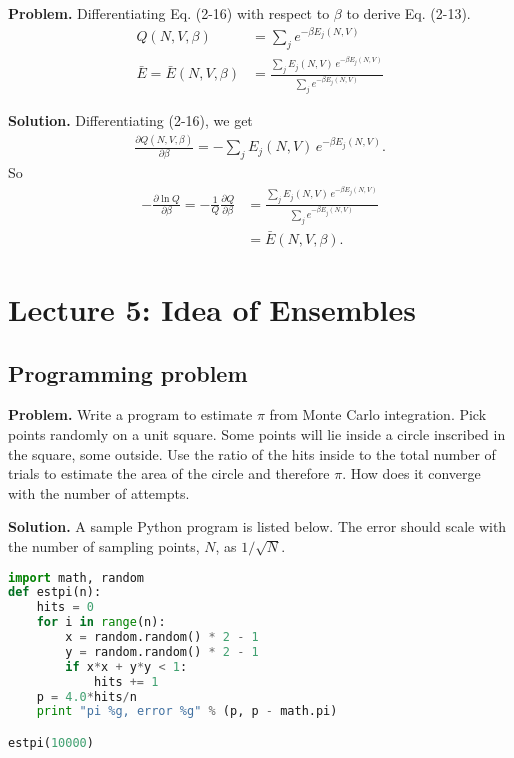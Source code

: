 \documentclass[twocolumn, 10pt]{article}
\numberwithin{equation}{section}
\newenvironment{problem}
{\par\medskip\sffamily \color{problue}
  \textbf{Problem. }\ignorespaces}
{\medskip}
\newenvironment{solution}
{\par\medskip
  \textbf{Solution. }\ignorespaces}
{\medskip}
\begin{document}
\begin{problem}
  Differentiating Eq. (2-16) with respect to $\beta$
  to derive Eq. (2-13).
  \begin{align}
    Q(N, V, \beta)
    &= \sum_j e^{-\beta E_j(N, V)}
    \tag{2-16}
    \\
    \bar E = \bar E(N, V, \beta)
    &=
    \frac{ \sum_j E_j(N, V) \, e^{-\beta E_j(N, V)} }
         { \sum_j e^{-\beta E_j(N, V) } }
    \tag{2-13}
  \end{align}
\end{problem}

\begin{solution}
Differentiating (2-16), we get
\begin{align*}
  \frac{ \partial Q(N, V, \beta) } { \partial \beta }
  = -\sum_j E_j(N, V) \, e^{-\beta E_j(N, V)}.
\end{align*}
So
\begin{align*}
  -\frac{ \partial \ln Q } { \partial \beta }
  =
  -\frac{1}{Q}
  \frac{ \partial Q } { \partial \beta }
  &=
  \frac{ \sum_j E_j(N, V) \, e^{-\beta E_j(N, V)} }
       { \sum_j e^{-\beta E_j(N, V)} }
  \\
  &=\bar E(N, V, \beta)
  .
\end{align*}
\end{solution}

\section{Lecture 5: Idea of Ensembles}

\subsection{Programming problem}

\begin{problem}
Write a program to estimate $\pi$ from Monte Carlo integration.
%
Pick points randomly on a unit square.
%
Some points will lie inside a circle inscribed in the square,
some outside.
%
Use the ratio of the hits inside to the total number of trials
to estimate the area of the circle and therefore $\pi$.
%
How does it converge with the number of attempts.
\end{problem}

\begin{solution}
A sample Python program is listed below.
The error should scale
with the number of sampling points, $N$,
as $1/\sqrt N$.

\begin{lstlisting}[language=Python]
import math, random
def estpi(n):
    hits = 0
    for i in range(n):
        x = random.random() * 2 - 1
        y = random.random() * 2 - 1
        if x*x + y*y < 1:
            hits += 1
    p = 4.0*hits/n
    print "pi %g, error %g" % (p, p - math.pi)

estpi(10000)
\end{lstlisting}
\end{solution}
\end{document}
